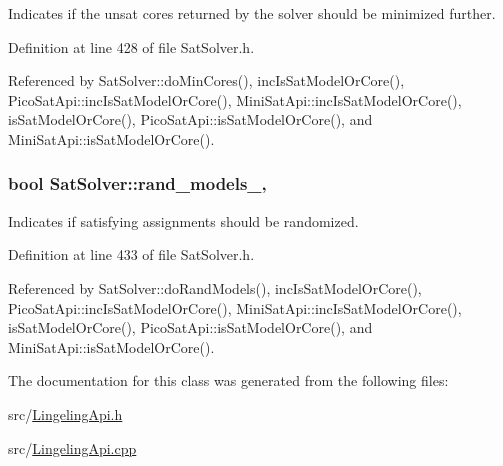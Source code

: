 Indicates if the unsat cores returned by the solver should be minimized further. 



Definition at line 428 of file Sat\-Solver.\-h.



Referenced by Sat\-Solver\-::do\-Min\-Cores(), inc\-Is\-Sat\-Model\-Or\-Core(), Pico\-Sat\-Api\-::inc\-Is\-Sat\-Model\-Or\-Core(), Mini\-Sat\-Api\-::inc\-Is\-Sat\-Model\-Or\-Core(), is\-Sat\-Model\-Or\-Core(), Pico\-Sat\-Api\-::is\-Sat\-Model\-Or\-Core(), and Mini\-Sat\-Api\-::is\-Sat\-Model\-Or\-Core().

\hypertarget{classSatSolver_a73fed24d8fb4da85ef82dc53ac5f28c7}{
\subsubsection[{rand\-\_\-models\-\_\-}]{\setlength{\rightskip}{0pt plus 5cm}bool Sat\-Solver\-::rand\-\_\-models\-\_\-\hspace{0.3cm}{\ttfamily [protected]}, {\ttfamily [inherited]}}}\label{classSatSolver_a73fed24d8fb4da85ef82dc53ac5f28c7}


Indicates if satisfying assignments should be randomized. 



Definition at line 433 of file Sat\-Solver.\-h.



Referenced by Sat\-Solver\-::do\-Rand\-Models(), inc\-Is\-Sat\-Model\-Or\-Core(), Pico\-Sat\-Api\-::inc\-Is\-Sat\-Model\-Or\-Core(), Mini\-Sat\-Api\-::inc\-Is\-Sat\-Model\-Or\-Core(), is\-Sat\-Model\-Or\-Core(), Pico\-Sat\-Api\-::is\-Sat\-Model\-Or\-Core(), and Mini\-Sat\-Api\-::is\-Sat\-Model\-Or\-Core().



The documentation for this class was generated from the following files\-:\begin{DoxyCompactItemize}
\item 
src/\hyperlink{LingelingApi_8h}{Lingeling\-Api.\-h}\item 
src/\hyperlink{LingelingApi_8cpp}{Lingeling\-Api.\-cpp}\end{DoxyCompactItemize}

